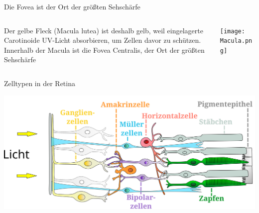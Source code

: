 \documentclass{beamer}
\begin{document}
    
\begin{frame}{Die Fovea ist der Ort der größten Sehschärfe}



\begin{columns}[c]
    
    \begin{column}{4cm}
    
        Der gelbe Fleck (Macula lutea) ist deshalb gelb, weil eingelagerte Carotinoide UV-Licht absorbieren, um Zellen davor zu schützen.  \\
        
        Innerhalb der Macula ist die Fovea Centralis, der Ort der größten Sehschärfe

    
    \end{column}


    \begin{column}{7cm}

    \begin{center}
        \texttt{[image: Macula.png]}
    \end{center}

    \end{column}
    
    \end{columns}
    
\end{frame}


    
    
    
    \begin{frame}{Zelltypen in der Retina}
    
    \begin{center}
        \includegraphics[width=\textwidth]{Retina_de.png}
    \end{center}
        
    \end{frame}
    
\end{document}
